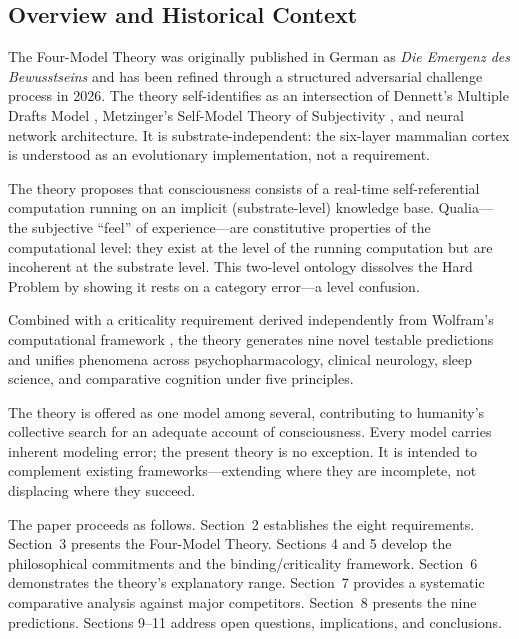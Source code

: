 \documentclass[12pt]{article}
\begin{document}
\subsection{Overview and Historical Context}

The Four-Model Theory was originally published in German as \emph{Die Emergenz des Bewusstseins} \citep{Gruber2015} and has been refined through a structured adversarial challenge process in 2026. The theory self-identifies as an intersection of Dennett's Multiple Drafts Model \citep{Dennett1991}, Metzinger's Self-Model Theory of Subjectivity \citep{Metzinger2003,Metzinger2009}, and neural network architecture. It is substrate-independent: the six-layer mammalian cortex is understood as an evolutionary implementation, not a requirement.

The theory proposes that consciousness consists of a real-time self-referential computation running on an implicit (substrate-level) knowledge base. Qualia---\hspace{0pt}the subjective ``feel'' of experience---\hspace{0pt}are constitutive properties of the computational level: they exist at the level of the running computation but are incoherent at the substrate level. This two-level ontology dissolves the Hard Problem by showing it rests on a category error---\hspace{0pt}a level confusion.

Combined with a criticality requirement derived independently from Wolfram's computational framework \citep{Wolfram2002}, the theory generates nine novel testable predictions and unifies phenomena across psychopharmacology, clinical neurology, sleep science, and comparative cognition under five principles.

The theory is offered as one model among several, contributing to humanity's collective search for an adequate account of consciousness. Every model carries inherent modeling error; the present theory is no exception. It is intended to complement existing frameworks---\hspace{0pt}extending where they are incomplete, not displacing where they succeed.

The paper proceeds as follows. Section~2 establishes the eight requirements. Section~3 presents the Four-Model Theory. Sections 4 and 5 develop the philosophical commitments and the binding/criticality framework. Section~6 demonstrates the theory's explanatory range. Section~7 provides a systematic comparative analysis against major competitors. Section~8 presents the nine predictions. Sections 9--11 address open questions, implications, and conclusions.
\end{document}

